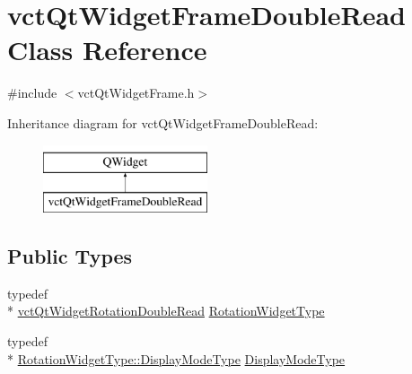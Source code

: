 \hypertarget{classvct_qt_widget_frame_double_read}{\section{vct\-Qt\-Widget\-Frame\-Double\-Read Class Reference}
\label{classvct_qt_widget_frame_double_read}
}


{\ttfamily \#include $<$vct\-Qt\-Widget\-Frame.\-h$>$}

Inheritance diagram for vct\-Qt\-Widget\-Frame\-Double\-Read\-:\begin{figure}[H]
\begin{center}
\leavevmode
\includegraphics[height=2.000000cm]{d5/dd1/classvct_qt_widget_frame_double_read}
\end{center}
\end{figure}
\subsection*{Public Types}
\begin{DoxyCompactItemize}
\item 
typedef \\*
\hyperlink{classvct_qt_widget_rotation_double_read}{vct\-Qt\-Widget\-Rotation\-Double\-Read} \hyperlink{classvct_qt_widget_frame_double_read_ad3cec78c5f6f6bb0b0defc37f59609f3}{Rotation\-Widget\-Type}
\item 
typedef \\*
\hyperlink{classvct_qt_widget_rotation_double_read_a77ae5a0ee5fe231ad2f9dd020aad434c}{Rotation\-Widget\-Type\-::\-Display\-Mode\-Type} \hyperlink{classvct_qt_widget_frame_double_read_afeb1fb838730eda5701c59fd3bc010db}{Display\-Mode\-Type}
\end{DoxyCompactItemize}
